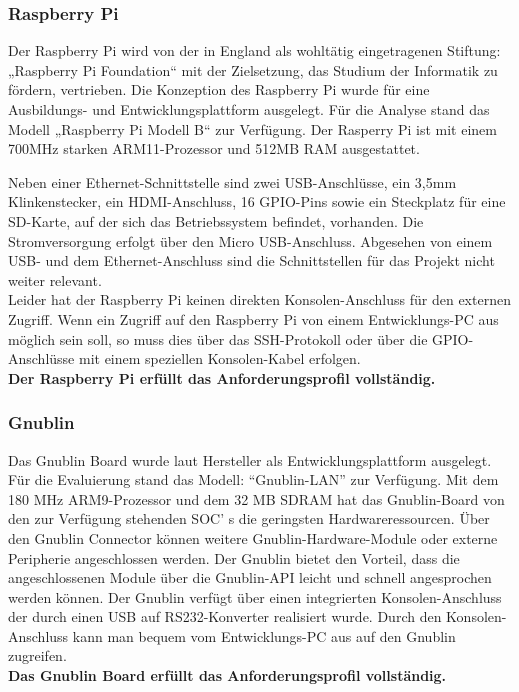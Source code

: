 \documentclass[../Bachelorarbeit.tex]{subfiles}
\begin{document}
\subsubsection*{Raspberry Pi}
\label{para:raspberry_pi} 
Der Raspberry Pi wird von der in England als wohltätig eingetragenen Stiftung: „Raspberry Pi Foundation“ mit der Zielsetzung, das Studium der Informatik zu fördern, vertrieben.
Die Konzeption des Raspberry Pi wurde für eine Ausbildungs- und Entwicklungsplattform ausgelegt. 
Für die Analyse stand das Modell „Raspberry Pi Modell B“ zur Verfügung. 
Der Rasperry Pi ist mit einem 700MHz starken \acs{ARM}11-Prozessor und 512MB RAM ausgestattet. 
\begin{comment}
Der Raspberry Pi verfügt über reichlich Hardwareschnittstellen.
\end{comment}
Neben einer Ethernet-Schnittstelle sind zwei USB-Anschlüsse, ein 3,5mm Klinkenstecker, ein HDMI-Anschluss, 16 \ac{GPIO}-Pins sowie ein Steckplatz für eine SD-Karte, auf der sich das Betriebssystem befindet, vorhanden. 
Die Stromversorgung erfolgt über den Micro USB-Anschluss.
Abgesehen von einem USB- und dem Ethernet-Anschluss sind die Schnittstellen für das Projekt nicht weiter relevant. \\
Leider hat der Raspberry Pi keinen direkten Konsolen-Anschluss für den externen Zugriff. 
Wenn ein Zugriff auf den Raspberry Pi von einem Entwicklungs-PC aus möglich sein soll, so muss dies über das \ac{SSH}-Protokoll oder über die \ac{GPIO}-Anschlüsse mit einem speziellen Konsolen-Kabel erfolgen. \parencites[vgl.][]{raspberryPi_about}[und][]{raspberryPi_faq}\\
\textbf{Der Raspberry Pi erfüllt das Anforderungsprofil vollständig.}

\subsubsection*{Gnublin}
\label{para:gnublin} 
Das Gnublin Board wurde laut Hersteller als Entwicklungsplattform ausgelegt. 
Für die Evaluierung stand das Modell: "`Gnublin-LAN"' zur Verfügung. 
Mit dem 180 MHz \ac{ARM}9-Prozessor und dem 32 MB \ac{SDRAM} hat das Gnublin-Board von den zur Verfügung stehenden \ac{SOC}' s die geringsten Hardwareressourcen. 
Über den Gnublin Connector können weitere Gnublin-Hardware-Module oder externe Peripherie angeschlossen werden. 
Der Gnublin bietet den Vorteil, dass die angeschlossenen Module über die Gnublin-\acs{API} leicht und schnell angesprochen werden können. 
Der Gnublin verfügt über einen integrierten Konsolen-Anschluss der durch einen USB auf RS232-Konverter realisiert wurde. 
Durch den Konsolen-Anschluss kann man bequem vom Entwicklungs-PC aus auf den Gnublin zugreifen. 
\parencite[vgl.][]{gnublin_details}\\
\textbf{Das Gnublin Board erfüllt das Anforderungsprofil vollständig.}
\end{document}
